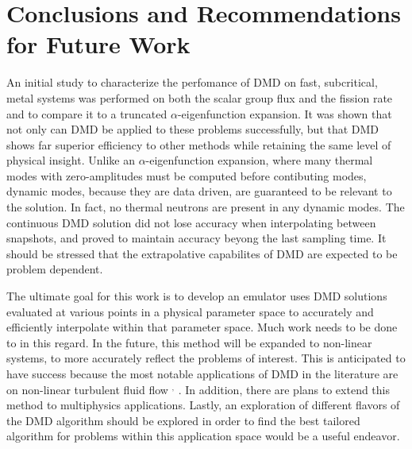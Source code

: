 \documentclass[12pt]{article}
\begin{document}
\section{Conclusions and Recommendations for Future Work}
An initial study to characterize the perfomance of DMD on fast, subcritical, 
	metal systems was performed on both the scalar group flux and the fission 
	rate and to compare it to a truncated $\alpha$-eigenfunction expansion.
It was shown that not only can DMD be applied to these problems successfully,
	but that DMD shows far superior efficiency to other methods while retaining 
	the same level of physical insight.
Unlike an $\alpha$-eigenfunction expansion, where many thermal modes with 
	zero-amplitudes must be computed before contibuting modes, dynamic modes, 
	because they are data driven, are guaranteed to be relevant to the solution.
In fact, no thermal neutrons are present in any dynamic modes.
The continuous DMD solution did not lose accuracy when interpolating between 
	snapshots, and proved to maintain accuracy beyong the last sampling time.
It should be stressed that the extrapolative capabilites of DMD are expected to 
	be problem dependent.

The ultimate goal for this work is to develop an emulator uses DMD solutions
	evaluated at various points in a physical parameter space to accurately and 
	efficiently interpolate within that parameter space.
Much work needs to be done to in this regard.
In the future, this method will be expanded to non-linear systems, to more accurately reflect the 
	problems of interest.
This is anticipated to have success because the most notable applications of
	DMD in the literature are on non-linear turbulent fluid flow 
	\cite{dmd2016}$^,$\cite{schmid2010} .
In addition, there are plans to extend this method to multiphysics applications. 
Lastly, an exploration of different flavors of the DMD algorithm should be 
	explored in order to find the best tailored algorithm for problems within 
	this application space would be a useful endeavor.


\setlength{\baselineskip}{12pt}


\end{document}
